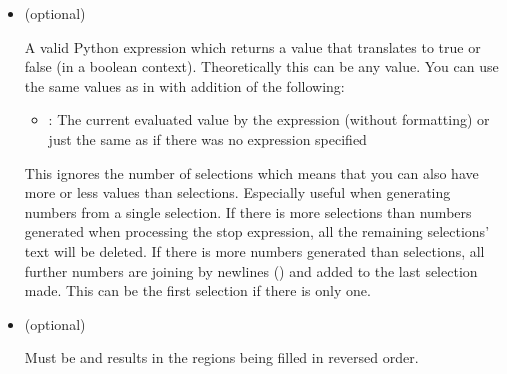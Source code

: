 \documentclass[letterpaper,12pt,english]{sphinxmanual}
\begin{document}
\begin{itemize}
\begin{itemize}
\begin{itemize}
\item {} 
: The number of selections

\item {} 
: Just an integer holding the counter for the iteration;
starts at  and is increased by  in every loop

\item {} 
\sphinxcode{\sphinxupquote{\_}}: The current value before the expression
()

\item {} 
: The result of the previously evaluated value (without
formatting);  for the first value

\item {} 
,  and : Useful modules that are
pre\sphinxhyphen{}imported for you

\end{itemize}

: The return value does not have to be a number type, you
can also generate strings, tuples or booleans.

\end{itemize}

\item {} 
 (optional)

A valid Python expression which returns a value that translates to
true or false (in a boolean context). Theoretically this can be any
value. You can use the same values as in  with addition of
the following:
\begin{itemize}
\item {} 
: The current evaluated value by the expression (without
formatting) or just the same as \sphinxcode{\sphinxupquote{\_}} if there was no expression
specified

\end{itemize}

This ignores the number of selections which means that you can also
have more or less values than selections. Especially useful when
generating numbers from a single selection. \sphinxhyphen{} If there is more
selections than numbers generated when processing the stop
expression, all the remaining selections’ text will be deleted. \sphinxhyphen{} If
there is more numbers generated than selections, all further numbers
are joining by newlines () and added to the last selection
made. This can be the first selection if there is only one.

\item {} 
 (optional)

Must be \sphinxcode{\sphinxupquote{!}} and results in the regions being filled in reversed
order.

\end{itemize}
\end{document}
